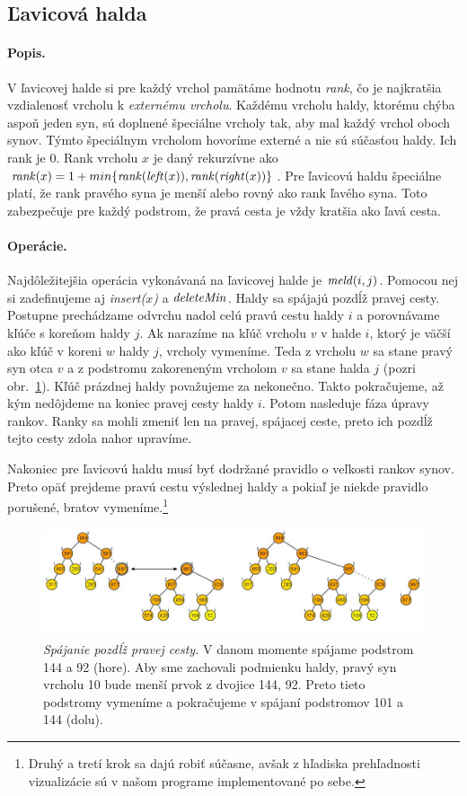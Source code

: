 \subsection{Ľavicová halda} 
\paragraph{Popis.}
V ľavicovej halde si pre každý vrchol pamätáme hodnotu \emph{rank}, čo je najkratšia 
vzdialenosť vrcholu k \emph{externému vrcholu}. Každému vrcholu haldy, ktorému chýba aspoň jeden syn, sú 
doplnené špeciálne vrcholy tak, aby mal každý vrchol oboch synov. Týmto špeciálnym vrcholom hovoríme externé 
a nie sú súčasťou haldy. Ich rank je $0$. Rank vrcholu $x$ je daný rekurzívne ako $\mathop{\mathit{rank}}(x) 
= 1 + min\{\mathop{\mathit{rank}}(\mathop{\mathit{left}}(x)), \mathop{\mathit{rank}}(\mathop{\mathit{right}}(x)) \}$. 
Pre ľavicovú haldu špeciálne platí, že rank pravého syna je menší alebo rovný ako rank ľavého syna.
Toto zabezpečuje pre každý podstrom, že pravá cesta je vždy kratšia ako ľavá cesta.

\paragraph{Operácie.}
Najdôležitejšia operácia vykonávaná na ľavicovej halde je $\mathop{\mathit{meld}}(i,j)$. Pomocou nej si zadefinujeme aj \emph{insert($x$)} a 
$\mathop{\mathit{deleteMin}}$. Haldy sa spájajú pozdĺž pravej cesty. Postupne prechádzame odvrchu nadol celú pravú cestu haldy $i$ a 
porovnávame kľúče s koreňom haldy $j$. Ak narazíme na kľúč vrcholu $v$ v halde $i$, ktorý je väčší ako kľúč v koreni 
$w$ haldy $j$, vrcholy vymeníme. Teda z vrcholu $w$ sa stane pravý syn otca $v$ a z podstromu zakoreneným vrcholom $v$ sa
stane halda $j$ (pozri obr.~\ref{img:leftmeld}). Kľúč prázdnej haldy považujeme za nekonečno. Takto pokračujeme,
až kým nedôjdeme na koniec pravej cesty haldy $i$. Potom nasleduje fáza úpravy rankov. Ranky sa mohli zmeniť len na pravej,
spájacej ceste, preto ich pozdĺž tejto cesty zdola nahor upravíme.

Nakoniec pre ľavicovú haldu musí byť dodržané pravidlo o veľkosti rankov synov. Preto opäť prejdeme pravú cestu 
výslednej haldy a pokiaľ je niekde pravidlo porušené, bratov vymeníme.\footnote{Druhý a tretí krok sa dajú robiť 
súčasne, avšak z hľadiska prehľadnosti vizualizácie sú v našom programe implementované po sebe.}

\begin{figure}
\includegraphics[width=\columnwidth]{obrazky/leftistmeld.png}
\caption{\emph{Spájanie pozdĺž pravej cesty.} V danom momente spájame podstrom 144 a 92 (hore).
Aby sme zachovali podmienku haldy, pravý syn vrcholu 10 bude menší prvok z dvojice 144, 92.
Preto tieto podstromy vymeníme a pokračujeme v spájaní podstromov 101 a 144 (dolu).} 
\label{img:leftmeld}
\end{figure}

